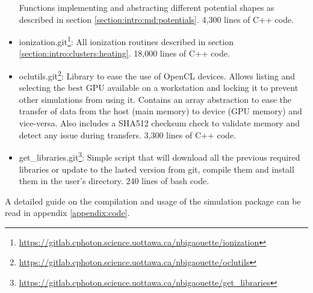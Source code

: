 \begin{itemize}
    Functions implementing and abstracting different potential shapes as
    described in section \ref{section:intro:md:potentials}. 4,300 lines of C++ code.
\item ionization.git\footnote{ \url{
    https://gitlab.cphoton.science.uottawa.ca/nbigaouette/ionization}}:
    All ionization routines described in section
    \ref{section:intro:clusters:heating}. 18,000 lines of C++ code.
\item oclutils.git\footnote{ \url{
    https://gitlab.cphoton.science.uottawa.ca/nbigaouette/oclutils}}:
    Library to ease the use of OpenCL devices. Allows listing and selecting the
    best GPU available on a workstation and locking it to prevent
    other simulations from using it. Contains an array abstraction to ease the
    transfer of data from the host (main memory) to device (GPU memory) and
    vice-versa. Also includes a SHA512 checksum check to validate memory
    and detect any issue during transfers. 3,300 lines of C++ code.
\item get\_libraries.git\footnote{ \url{
    https://gitlab.cphoton.science.uottawa.ca/nbigaouette/get_libraries}}:
    Simple script that will download all the previous required libraries or
    update to the lasted version from git, compile them and install them in the
    user's directory. 240 lines of bash code.
\end{itemize}
A detailed guide on the compilation and usage of the simulation package can be
read in appendix \ref{appendix:code}.

